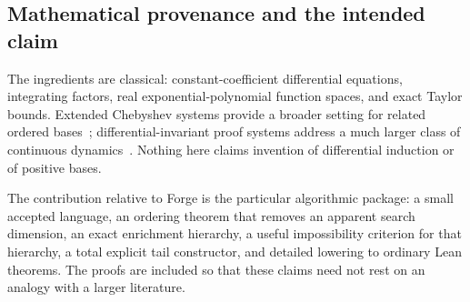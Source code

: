 \subsection{Mathematical provenance and the intended claim}

The ingredients are classical: constant-coefficient differential equations,
integrating factors, real exponential-polynomial function spaces, and exact
Taylor bounds. Extended Chebyshev systems provide a broader setting for related
ordered bases~\cite{chebyshev}; differential-invariant proof systems address a
much larger class of continuous dynamics~\cite{differential-invariance}.
Nothing here claims invention of differential induction or of positive bases.

The contribution relative to Forge is the particular algorithmic package: a
small accepted language, an ordering theorem that removes an apparent search
dimension, an exact enrichment hierarchy, a useful impossibility criterion for
that hierarchy, a total explicit tail constructor, and detailed lowering to
ordinary Lean theorems. The proofs are included so that these claims need not
rest on an analogy with a larger literature.

